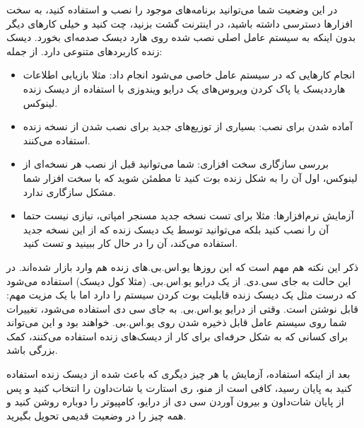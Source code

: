 در این وضعیت شما می‌توانید برنامه‌های موجود را نصب و استفاده کنید، به سخت افزارها دسترسی داشته باشید، در اینترنت گشت بزنید، چت کنید و خیلی کارهای دیگر بدون اینکه به سیستم عامل اصلی نصب شده روی هارد دیسک صدمه‌ای بخورد. دیسک زنده کاربردهای متنوعی دارد. از جمله:
\begin{itemize}
	\item انجام کارهایی که در سیستم عامل خاصی می‌شود انجام داد: مثلا بازیابی اطلاعات هارددیسک یا پاک کردن ویروس‌های یک درایو ویندوزی با استفاده از دیسک زنده لینوکس.
	\item آماده شدن برای نصب: بسیاری از توزیع‌های جدید برای نصب شدن از نسخه زنده استفاده می‌کنند.
	\item بررسی سازگاری سخت افزاری: شما می‌توانید قبل از نصب هر نسخه‌ای از لینوکس، اول آن را به شکل زنده بوت کنید تا مطمئن شوید که با سخت افزار شما مشکل سازگاری ندارد.
	\item آزمایش نرم‌افزارها: مثلا برای تست نسخه جدید مسنجر امپاتی، نیازی نیست حتما آن را نصب کنید بلکه می‌توانید توسط یک دیسک زنده که از این نسخه جدید استفاده می‌کند، آن را در حال کار ببینید و تست کنید.
\end{itemize}
ذکر این نکته هم مهم است که این روزها یو.اس.بی.های زنده هم وارد بازار شده‌اند. در این حالت به جای سی.دی. از یک درایو یو.اس.بی. (مثلا کول دیسک) استفاده می‌شود که درست مثل یک دیسک زنده قابلیت بوت کردن سیستم را دارد اما با یک مزیت مهم: قابل نوشتن است. وقتی از درایو یو.اس.بی. به جای سی دی استفاده می‌شود، تغییرات شما روی سیستم عامل قابل ذخیره شدن روی یو.اس.بی. خواهند بود و این می‌تواند برای کسانی که به شکل حرفه‌ای برای کار از دیسک‌های زنده استفاده می‌کنند، کمک بزرگی باشد.

بعد از اینکه استفاده، آزمایش یا هر چیز دیگری که باعث شده از دیسک زنده استفاده کنید به پایان رسید، کافی است از منو، ری استارت یا شات‌داون را انتخاب کنید و پس از پایان شات‌داون و بیرون آوردن سی دی از درایو، کامپیوتر را دوباره روشن کنید و همه چیز را در وضعیت قدیمی تحویل بگیرید.
